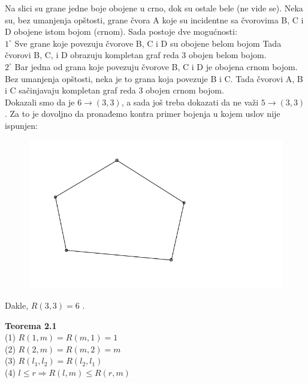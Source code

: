 \documentclass[12pt,a4paper]{article}
\begin{document}
	\noindent Na slici su grane jedne boje obojene u crno, dok su ostale bele (ne vide se).
	Neka su, bez umanjenja opštosti, grane čvora A koje su incidentne sa čvorovima B, C i D obojene istom bojom (crnom). Sada postoje dve mogućnosti: 
	\vspace{1em}
	\\
	$1^\circ$ Sve grane koje povezuju čvorove B, C i D su obojene belom bojom Tada čvorovi B, C, i D obrazuju kompletan graf reda 3 obojen belom bojom.
	\vspace{0.5em}
	\\
	$2^\circ$ Bar jedna od grana koje povezuju čvorove B, C i D je obojena crnom bojom. Bez umanjenja opštosti, neka je to grana koja povezuje B i C. Tada čvorovi A, B i C sačinjavaju kompletan graf reda 3 obojen crnom bojom.
	\vspace{0.5em}
	\\Dokazali smo da je $6 \rightarrow (3, 3)$, a sada još treba dokazati da ne važi $5 \rightarrow (3, 3)$. Za to je dovoljno da pronađemo kontra primer bojenja u kojem uslov nije ispunjen:
	\begin{figure}[h]
	\centering
	\includegraphics[scale=1.3]{r33kp.png}
	\end{figure}
	
	Dakle, $R(3,3)=6$ .	
	
	\newpage
	
	{\noindent\fontsize{12pt}{12pt}\textbf{Teorema 2.1}}
	\vspace{0.5em}	
	\\
	(1) {} {} $R(1, m) = R(m, 1) = 1$\\
	(2) {} {} $R(2, m) = R(m, 2) = m$\\
	(3) {} {} $R(l_{1}, l_{2}) = R(l_{2}, l_{1})$\\
	(4) {} {} $l \leq r \Rightarrow R(l, m) \leq R(r, m)$\\
	
\end{document}
